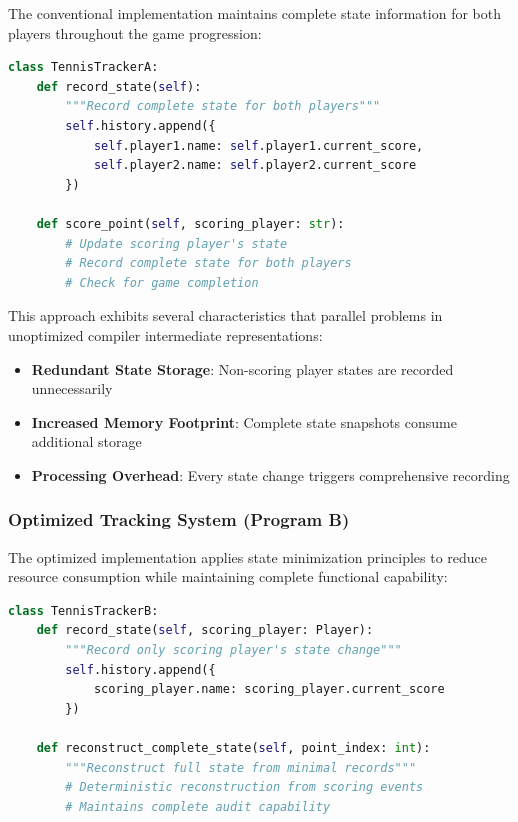 The conventional implementation maintains complete state information for both players throughout the game progression:

\begin{lstlisting}[style=riftlang, language=python]
class TennisTrackerA:
    def record_state(self):
        """Record complete state for both players"""
        self.history.append({
            self.player1.name: self.player1.current_score,
            self.player2.name: self.player2.current_score
        })
    
    def score_point(self, scoring_player: str):
        # Update scoring player's state
        # Record complete state for both players
        # Check for game completion
\end{lstlisting}

This approach exhibits several characteristics that parallel problems in unoptimized compiler intermediate representations:

\begin{itemize}
\item \textbf{Redundant State Storage}: Non-scoring player states are recorded unnecessarily
\item \textbf{Increased Memory Footprint}: Complete state snapshots consume additional storage
\item \textbf{Processing Overhead}: Every state change triggers comprehensive recording
\end{itemize}

\subsubsection{Optimized Tracking System (Program B)}

The optimized implementation applies state minimization principles to reduce resource consumption while maintaining complete functional capability:

\begin{lstlisting}[style=riftlang, language=python]
class TennisTrackerB:
    def record_state(self, scoring_player: Player):
        """Record only scoring player's state change"""
        self.history.append({
            scoring_player.name: scoring_player.current_score
        })
    
    def reconstruct_complete_state(self, point_index: int):
        """Reconstruct full state from minimal records"""
        # Deterministic reconstruction from scoring events
        # Maintains complete audit capability
\end{lstlisting}

